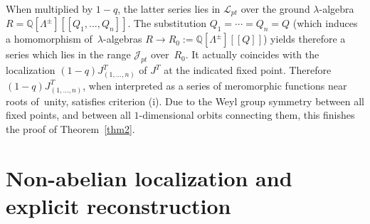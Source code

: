 \documentclass[pdftex]{sigma}
\numberwithin{equation}{section}
\def\J{\mathcal J}
\def\L{\mathcal L}
\def\QQ{\mathbb Q}
\begin{document}
When multiplied by $1-q$, the latter series lies in $\L_{pt}$ over the ground $\lambda$-algebra $R=\QQ[\Lambda^{\pm}][[Q_1,\dots,Q_n]]$. The substitution $Q_1=\cdots=Q_n=Q$ (which induces a homomorphism of~$\lambda$-algebras $R\to R_0:=\QQ[\Lambda^{\pm}][[Q]]$) yields therefore a series which lies in the range $\J_{pt}$ over~$R_0$. It actually coincides with the localization $(1-q) J^T_{(1,\dots,n)}$ of $J^T$ at the indicated fixed point. Therefore $(1-q) J^T_{(1,\dots,n)}$, when interpreted as a series of meromorphic functions near roots of~unity, satisfies criterion (i). Due to the Weyl group symmetry between all fixed points, and between all $1$-dimensional orbits connecting them, this finishes the proof of Theorem~\ref{thm2}.


\section{Non-abelian localization and explicit reconstruction}
\label{Sec4}
\end{document}
